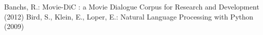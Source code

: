 \begin{thebibliography}
%
Banchs, R.:
Movie-DiC : a Movie Dialogue Corpus for Research and Development (2012)
% 
Bird, S., Klein, E., Loper, E.: Natural Language Processing with Python (2009)
\end{thebibliography}